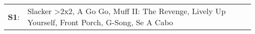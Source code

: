 \begin{supertabular}{p{0.03\textwidth}p{0.92\textwidth}}
 \textbf{S1}:  &  Slacker\textsuperscript{} \textgreater \enspace 2x2\textsuperscript{}, \enspace A Go Go\textsuperscript{}, \enspace Muff II: The Revenge\textsuperscript{}, \enspace Lively Up Yourself\textsuperscript{}, \enspace Front Porch\textsuperscript{}, \enspace G-Song\textsuperscript{}, \enspace Se A Cabo\textsuperscript{}  \enspace  \\
\end{supertabular}
